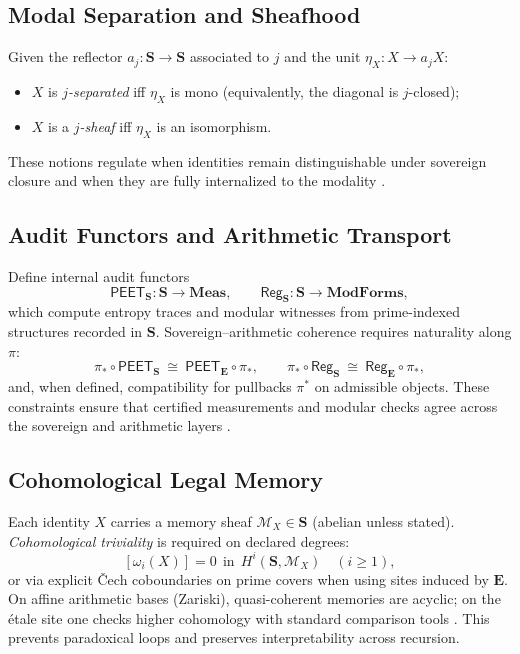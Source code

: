 \documentclass[12pt]{amsart}
\theoremstyle{plain}
\begin{document}
\subsection{Modal Separation and Sheafhood}
Given the reflector $a_j:\mathbf{S}\to\mathbf{S}$ associated to $j$ and the unit $\eta_X:X\to a_j X$:
\begin{itemize}
  \item $X$ is \emph{$j$-separated} iff $\eta_X$ is mono (equivalently, the diagonal is $j$-closed);
  \item $X$ is a \emph{$j$-sheaf} iff $\eta_X$ is an isomorphism.
\end{itemize}
These notions regulate when identities remain distinguishable under sovereign closure and when they are fully internalized to the modality \cite{maclane1992sheaves,johnstone2002elephant}.

\subsection{Audit Functors and Arithmetic Transport}
Define internal audit functors
\[
\mathsf{PEET}_{\mathbf{S}}:\mathbf{S}\to\mathbf{Meas},\qquad
\mathsf{Reg}_{\mathbf{S}}:\mathbf{S}\to\mathbf{ModForms},
\]
which compute entropy traces and modular witnesses from prime-indexed structures recorded in $\mathbf{S}$. Sovereign–arithmetic coherence requires naturality along $\pi$:
\[
\pi_{\ast}\circ \mathsf{PEET}_{\mathbf{S}}\ \cong\ \mathsf{PEET}_{\mathbf{E}}\circ \pi_{\ast},
\qquad
\pi_{\ast}\circ \mathsf{Reg}_{\mathbf{S}}\ \cong\ \mathsf{Reg}_{\mathbf{E}}\circ \pi_{\ast},
\]
and, when defined, compatibility for pullbacks $\pi^{\ast}$ on admissible objects. These constraints ensure that certified measurements and modular checks agree across the sovereign and arithmetic layers \cite{maclane1992sheaves,johnstone2002elephant,milne1980etale}.

\subsection{Cohomological Legal Memory}
Each identity $X$ carries a memory sheaf $\mathscr{M}_X\in\mathbf{S}$ (abelian unless stated). \emph{Cohomological triviality} is required on declared degrees:
\[
[\omega_i(X)]=0\ \ \text{in}\ \ H^i(\mathbf{S},\mathscr{M}_X)\quad (i\ge1),
\]
or via explicit Čech coboundaries on prime covers when using sites induced by $\mathbf{E}$. On affine arithmetic bases (Zariski), quasi-coherent memories are acyclic; on the étale site one checks higher cohomology with standard comparison tools \cite{hartshorne1977algebraic,milne1980etale,maclane1992sheaves,johnstone2002elephant}. This prevents paradoxical loops and preserves interpretability across recursion.
\end{document}
